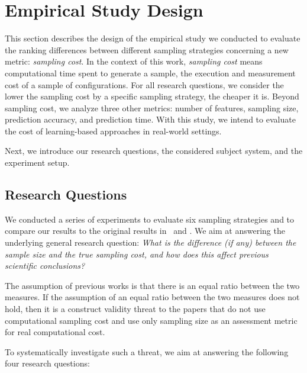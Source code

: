 \section{Empirical Study Design} \label{sec:study_design}

This section describes the design of the empirical study we conducted to evaluate the ranking differences between different sampling strategies concerning a new metric: \textit{sampling cost}.
In the context of this work, \textit{sampling cost} means computational time spent to generate a sample, the execution and measurement cost of a sample of configurations. 
For all research questions, we consider the lower the sampling cost by a specific sampling strategy, the cheaper it is. 
Beyond sampling cost, we analyze three other metrics: number of features, sampling size, prediction accuracy, and prediction time.
With this study, we intend to evaluate the cost of learning-based approaches in real-world settings.

Next, we introduce our research questions, the considered subject system, and the experiment setup.

\subsection{Research Questions} \label{research_questions}

We conducted a series of experiments to evaluate six sampling strategies and to compare our results to the original results in~\cite{kaltenecker2019} and \cite{pereira2020}. 
We aim at answering the underlying general research question: 
\textit{What is the difference (if any) between the sample size and the true sampling cost, and how does this affect previous scientific conclusions?}

The assumption of previous works is that there is an equal ratio between the two measures.
If the assumption of an equal ratio between the two measures does not hold, then it is a construct validity threat to the papers that do not use computational sampling cost and use only sampling size as an assessment metric for real computational cost. 

To systematically investigate such a threat, we aim at answering the following four research questions:

